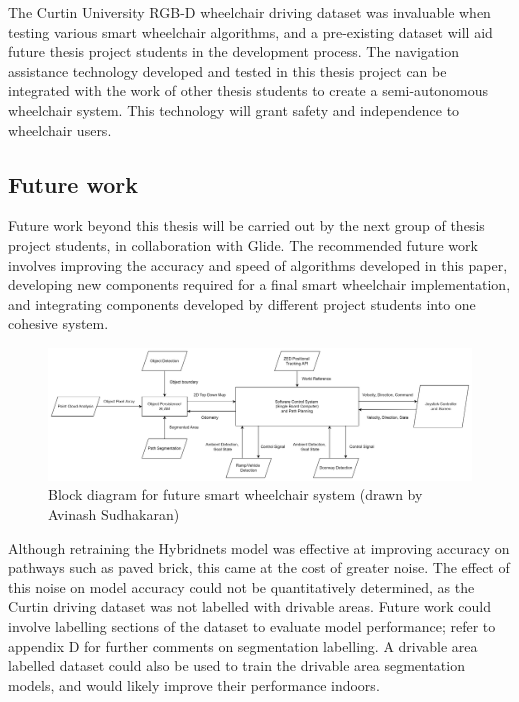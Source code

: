 The Curtin University RGB-D wheelchair driving dataset was invaluable
when testing various smart wheelchair algorithms, and a pre-existing dataset will
aid future thesis project students in the development process.
The navigation assistance technology developed and tested in this thesis project
can be integrated with the work of other thesis students to create a semi-autonomous
wheelchair system. This technology will grant safety and independence
to wheelchair users.

\pagebreak
\subsection{Future work}
\label{sec:future_work}
Future work beyond this thesis will be carried out by the next
group of thesis project students, in collaboration with Glide.
The recommended future work involves improving the accuracy
and speed of algorithms developed in this paper, developing
new components required for a final smart wheelchair implementation,
and integrating components developed by different project students into 
one cohesive system.

\begin{figure}[b]
    \centering
    \includegraphics[width=\linewidth]{images/top_level_software_pipeline.png}
    \caption{Block diagram for future smart wheelchair system (drawn by Avinash Sudhakaran)}
    \label{fig:top_level_software_pipeline}
\end{figure}

Although retraining the Hybridnets model was effective at improving
accuracy on pathways such as paved brick, this came at the cost
of greater noise. The effect of this noise on model accuracy
could not be quantitatively determined, as the Curtin driving dataset
was not labelled with drivable areas. Future work could involve labelling sections of the
dataset to evaluate model performance; refer to appendix D for further comments on segmentation labelling.
A drivable area labelled dataset could
also be used to train the drivable area segmentation models,
and would likely improve their performance indoors.

